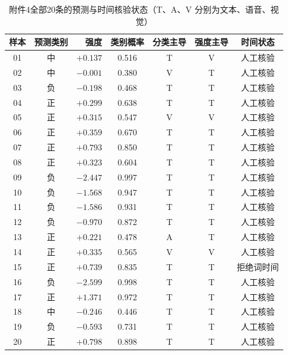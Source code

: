\begin{table}[H]
\centering
\caption{附件4全部20条的预测与时间核验状态（T、A、V 分别为文本、语音、视觉）}\label{tab:appC}
\begin{tabular}{ccrcccc}
\toprule
样本 & 预测类别 & 强度 & 类别概率 & 分类主导 & 强度主导 & 时间状态 \\
\midrule
01 & 中 & $+0.137$ & 0.516 & T & V & 人工核验 \\
02 & 中 & $-0.001$ & 0.380 & V & T & 人工核验 \\
03 & 负 & $-0.198$ & 0.468 & T & T & 人工核验 \\
04 & 正 & $+0.299$ & 0.638 & T & T & 人工核验 \\
05 & 正 & $+0.315$ & 0.547 & V & V & 人工核验 \\
06 & 正 & $+0.359$ & 0.670 & T & T & 人工核验 \\
07 & 正 & $+0.793$ & 0.850 & T & T & 人工核验 \\
08 & 正 & $+0.323$ & 0.604 & T & T & 人工核验 \\
09 & 负 & $-2.447$ & 0.997 & T & T & 人工核验 \\
10 & 负 & $-1.568$ & 0.947 & T & T & 人工核验 \\
11 & 负 & $-1.586$ & 0.931 & T & T & 人工核验 \\
12 & 负 & $-0.970$ & 0.872 & T & T & 人工核验 \\
13 & 正 & $+0.221$ & 0.478 & A & T & 人工核验 \\
14 & 正 & $+0.335$ & 0.565 & V & V & 人工核验 \\
15 & 正 & $+0.739$ & 0.835 & T & T & 拒绝词时间 \\
16 & 负 & $-2.599$ & 0.998 & T & T & 人工核验 \\
17 & 正 & $+1.371$ & 0.972 & T & T & 人工核验 \\
18 & 中 & $-0.246$ & 0.446 & T & T & 人工核验 \\
19 & 负 & $-0.593$ & 0.731 & T & T & 人工核验 \\
20 & 正 & $+0.798$ & 0.898 & T & T & 人工核验 \\
\bottomrule
\end{tabular}
\end{table}
